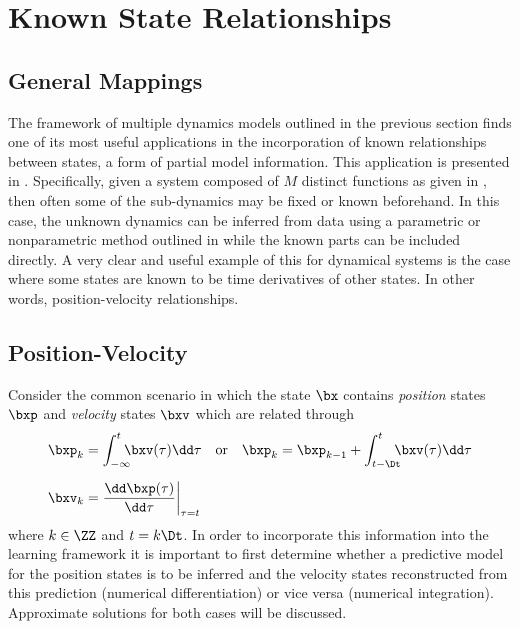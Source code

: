 \section{Known State Relationships}

\subsection{General Mappings}
The framework of multiple dynamics models outlined in the previous section finds one of its most useful applications in the incorporation of known relationships between states, a form of partial model information. This application is presented in \cite{HRM12}. Specifically, given a system composed of $M$ distinct functions as given in , then often some of the sub-dynamics may be fixed or known beforehand. In this case, the unknown dynamics can be inferred from data using a parametric or nonparametric method outlined in  while the known parts can be included directly. A very clear and useful example of this for dynamical systems is the case where some states are known to be time derivatives of other states. In other words, position-velocity relationships.



\subsection{Position-Velocity}
\label{sec:posvel}




Consider the common scenario in which the state $\bx$ contains \textit{position} states $\bxp$ and \textit{velocity} states $\bxv$ which are related through
\begin{align}
\bxp_k &= \int_{-\infty}^t \!\!\!\!\bxv(\tau) \dd\tau \quad\text{or}\quad
\bxp_k = \bxp_{k-1} + \int_{t-\Dt}^t \!\!\!\!\bxv(\tau) \dd\tau \label{eqn:posint} \\[0.2cm]
\bxv_k &= \frac{\dd\bxp(\tau)}{\dd \tau} \bigg|_{\tau = t} \label{eqn:veldiff}
\end{align}
where $k \in \ZZ$ and $t = k\Dt$. In order to incorporate this information into the learning framework it is important to first determine whether a predictive model for the position states is to be inferred and the velocity states reconstructed from this prediction (numerical differentiation) or vice versa (numerical integration). Approximate solutions for both cases will be discussed.

